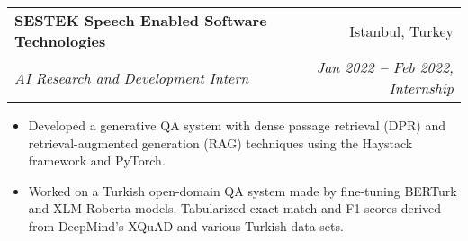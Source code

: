 \documentclass[letterpaper,11pt]{article}
\makeatletter
\newcommand{\resumeItem}[1]{
  \item\small{
    {#1 \vspace{-2pt}}
  }
}
\newcommand{\resumeSubheading}[4]{
  \vspace{-2pt}\item
    \begin{tabular*}{0.97\textwidth}[t]{l@{\extracolsep{\fill}}r}
      \textbf{#1} & #2 \\
      \textit{\small#3} & \textit{\small #4} \\
    \end{tabular*}\vspace{-7pt}
}
\newcommand{\resumeItemListStart}{\begin{itemize}}
\newcommand{\resumeItemListEnd}{\end{itemize}\vspace{-5pt}}
\makeatother
\begin{document}

    \resumeSubheading
      {SESTEK Speech Enabled Software Technologies}{Istanbul, Turkey}
      {AI Research and Development Intern}{Jan 2022 \textbf{--} Feb 2022, Internship}
        \resumeItemListStart
            \resumeItem{Developed a generative QA system with dense passage retrieval (DPR) and retrieval-augmented generation (RAG) techniques using the Haystack framework and PyTorch.}
            \resumeItem{Worked on a Turkish open-domain QA system made by fine-tuning BERTurk and XLM-Roberta models. Tabularized exact match and F1 scores derived from DeepMind's XQuAD and various Turkish data sets.}
        \resumeItemListEnd

    
\end{document}
